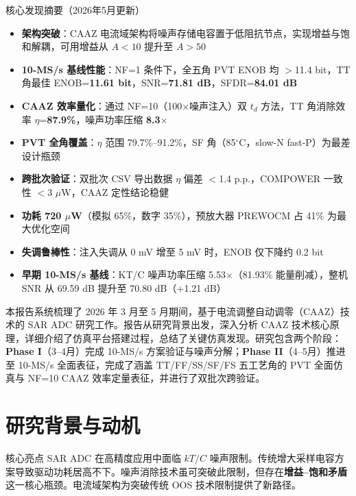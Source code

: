 \documentclass[11pt,a4paper,UTF8]{ctexart}
\begin{document}
\begin{findbox}{核心发现摘要（2026年5月更新）}
\begin{itemize}
  \item \textbf{架构突破}：CAAZ 电流域架构将噪声存储电容置于低阻抗节点，实现增益与饱和解耦，可用增益从 $A<10$ 提升至 $A>50$
  \item \textbf{10-MS/s 基线性能}：NF=1 条件下，全五角 PVT ENOB 均 $>$11.4 bit，TT 角最佳 ENOB=\textbf{11.61 bit}，SNR=\textbf{71.81 dB}，SFDR=\textbf{84.01 dB}
  \item \textbf{CAAZ 效率量化}：通过 NF=10（100$\times$噪声注入）双 $t_d$ 方法，TT 角消除效率 $\eta$=\textbf{87.9\%}，噪声功率压缩 \textbf{8.3$\times$}
  \item \textbf{PVT 全角覆盖}：$\eta$ 范围 79.7\%--91.2\%，SF 角（85$^\circ$C，slow-N fast-P）为最差设计瓶颈
  \item \textbf{跨批次验证}：双批次 CSV 导出数据 $\eta$ 偏差 $<$1.4 p.p.，COMPOWER 一致性 $<$3 $\mu$W，CAAZ 定性结论稳健
  \item \textbf{功耗 720 $\mu$W}（模拟 65\%，数字 35\%），预放大器 PREWOCM 占 41\% 为最大优化空间
  \item \textbf{失调鲁棒性}：注入失调从 0 mV 增至 5 mV 时，ENOB 仅下降约 0.2 bit
  \item \textbf{早期 10-MS/s 基线}：KT/C 噪声功率压缩 5.53$\times$（81.93\% 能量削减），整机 SNR 从 69.59 dB 提升至 70.80 dB（$+$1.21 dB）
\end{itemize}
\end{findbox}

本报告系统梳理了 2026 年 3 月至 5 月期间，基于电流调整自动调零（CAAZ）技术的 SAR ADC 研究工作。报告从研究背景出发，深入分析 CAAZ 技术核心原理，详细介绍了仿真平台搭建过程，总结了关键仿真发现。研究包含两个阶段：\textbf{Phase I}（3--4月）完成 10-MS/s 方案验证与噪声分解；\textbf{Phase II}（4--5月）推进至 10-MS/s 全面表征，完成了涵盖 TT/FF/SS/SF/FS 五工艺角的 PVT 全面仿真与 NF=10 CAAZ 效率定量表征，并进行了双批次跨验证。

\section{研究背景与动机}
\label{sec:background}

\begin{findbox}{核心亮点}
SAR ADC 在高精度应用中面临 $kT/C$ 噪声限制。传统增大采样电容方案导致驱动功耗居高不下。噪声消除技术虽可突破此限制，但存在\textbf{增益--饱和矛盾}这一核心瓶颈。电流域架构为突破传统 OOS 技术限制提供了新路径。
\end{findbox}
\end{document}
